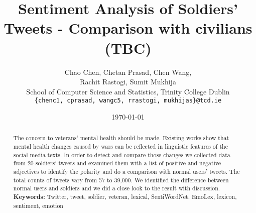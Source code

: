 \documentclass[english,a4paper,11pt]{article}
\title{Sentiment Analysis of Soldiers' Tweets - Comparison with civilians (TBC)}
\date{\today}
\author{
  Chao Chen, Chetan Prasad, Chen Wang, \\
  Rachit Rastogi, Sumit Mukhija \\
  School of Computer Science and Statistics, Trinity College Dublin\\
  \texttt{\{chenc1, cprasad, wangc5, rrastogi, mukhijas\}@tcd.ie}
}
\begin{document}
\maketitle
\thispagestyle{empty}
\pagestyle{empty}

\begin{abstract}
  The concern to veterans' mental health should be made. Existing works show that mental health changes caused by wars can be reflected in linguistic features of the social media texts. In order to detect and compare those changes we collected data from 20 soldiers' tweets and examined them with a list of positive and negative adjectives to identify the polarity and do a comparison with normal users' tweets. The total counts of tweets vary from 57 to 39,000. We identified the difference between normal users and soldiers and we did a close look to the result with discussion. \\
  \textbf{Keywords:} Twitter, tweet, soldier, veteran, lexical, SentiWordNet, EmoLex, lexicon, sentiment, emotion
\end{abstract}








\clearpage



\end{document}
